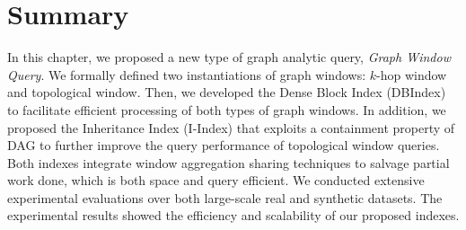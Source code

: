 \section{Summary}
In this chapter, we proposed a new type of graph analytic query, \emph{Graph Window Query}. We formally defined two instantiations of graph windows: $k$-hop window and topological window. Then, we developed the Dense Block Index (DBIndex) to facilitate efficient processing of both types of graph windows. In addition, we proposed the Inheritance Index (I-Index) that exploits a containment property of DAG to further improve the query performance of topological window queries. Both indexes integrate window aggregation sharing techniques to salvage partial work done, which is both space and query efficient. We conducted extensive experimental evaluations over both large-scale real and synthetic datasets. The experimental results showed the efficiency and scalability of our proposed indexes. 


